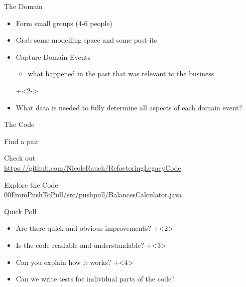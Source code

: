 \begin{frame}[fragile]{The Domain}

\begin{itemize}
\item Form small groups (4-6 people)
\item Grab some modelling space and some post-its
\item Capture Domain Events 
\begin{itemize}
\item what happened in the past that was relevant to the business
\end{itemize}
\onslide+<2->
\item What data is needed to fully determine all aspects of each domain event?
\end{itemize}

\end{frame}


\begin{frame}[fragile]{The Code}

\begin{center}
\Huge
Find a pair
\vspace{2em}

Check out \\
\vspace{1em}
\large
\url{https://github.com/NicoleRauch/RefactoringLegacyCode}

\vspace{2em}
Explore the Code \\
{\large \url{00FromPushToPull/src/pushpull/BalancesCalculator.java}}
\end{center}

\end{frame}

\begin{frame}[fragile]{Quick Poll}

\begin{itemize}
\onslide+<1>
\item Are there quick and obvious improvements?
\onslide+<2>
\item Is the code readable and understandable?
\onslide+<3>
\item Can you explain how it works?
\onslide+<4>
\item Can we write tests for individual parts of the code?
\end{itemize}

\end{frame}


